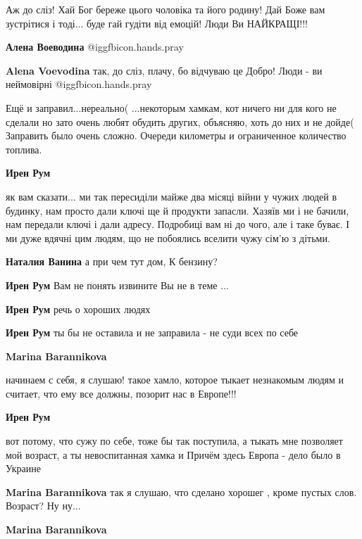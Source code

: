 \begin{itemize}
Аж до сліз! Хай Бог береже цього чоловіка та його родину! Дай Боже вам
зустрітися і тоді... буде гай гудіти від емоцій! Люди Ви НАЙКРАЩІ!!!

\textbf{Алена Воеводина}  @igg{fbicon.hands.pray} 

\textbf{Alena Voevodina} так, до сліз, плачу, бо відчуваю це Добро! Люди - ви неймовірні  @igg{fbicon.hands.pray} 


Ещё и заправил...нереально( ...некоторым хамкам, кот ничего ни для кого не
сделали но зато очень любят обудить других, объясняю, хоть до них и не дойде(
Заправить было очень сложно. Очереди километры и ограниченное количество
топлива.

\begin{itemize} %
\textbf{Ирен Рум} 

як вам сказати... ми так пересиділи майже два місяці війни у чужих людей в
будинку, нам просто дали ключі ще й продукти запасли. Хазяїв ми і не бачили, нам
передали ключі і дали адресу. Подробиці вам ні до чого, але і таке буває. І ми
дуже вдячні цим людям, що не побоялись вселити чужу сім'ю з дітьми.

\textbf{Наталия Ванина} а при чем тут дом, К бензину?

\textbf{Ирен Рум} Вам не понять извините Вы не в теме ...

\textbf{Ирен Рум} речь о хороших людях

\textbf{Ирен Рум} ты бы не оставила и не заправила - не суди всех по себе

\begin{itemize} %
\textbf{Marina Barannikova} 

начинаем с себя, я слушаю! такое хамло, которое тыкает незнакомым людям и
считает, что ему все должны, позорит нас в Европе!!!

\textbf{Ирен Рум} 

вот потому, что сужу по себе, тоже бы так поступила, а тыкать мне позволяет мой
возраст, а ты невоспитанная хамка и
Причём здесь Европа - дело было в Украине

\textbf{Marina Barannikova} так я слушаю, что сделано хорошег , кроме пустых слов. Возраст? Ну ну...

\textbf{Marina Barannikova}


\end{itemize}
\end{itemize}
\end{itemize}
